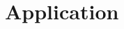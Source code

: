 \documentclass[../main.tex]{subfiles}
\begin{document}
\chapter{Application}
\label{chap:application}
\end{document}
